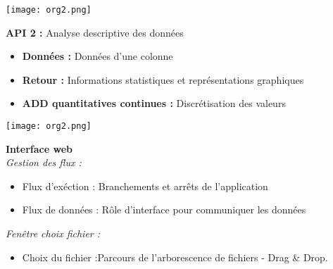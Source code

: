 	\begin{frame}
		\begin{center}\texttt{[image: org2.png]}\end{center}
	\end{frame}
	
	\begin{frame}
		\textbf{API 2 :} Analyse descriptive des données\\
		\begin{itemize}
			\item \textbf{Données :} Données d'une colonne
			\item \textbf{Retour :} Informations statistiques et représentations graphiques
			\item \textbf{ADD quantitatives continues :} Discrétisation des valeurs
		\end{itemize}	
	\end{frame}
	
	\begin{frame}
		\begin{center}\texttt{[image: org2.png]}\end{center}
	\end{frame}
	
	\begin{frame}
		\textbf{Interface web}\\
		\textit{Gestion des flux :}
		\begin{itemize}
			\item Flux d'exéction : Branchements et arrêts de l'application
			\item Flux de données : Rôle d'interface pour communiquer les données
		\end{itemize} \pause
		 \vspace{1cm}
		 
		\textit{Fenêtre choix fichier :}
		\begin{itemize}
			\item Choix du fichier :Parcours de l'arborescence de fichiers - Drag \& Drop.
		\end{itemize}
	\end{frame}
	
